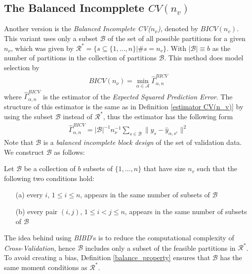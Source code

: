 \documentclass[Research_Module_ES.tex]{subfiles}
\begin{document}
\subsection{The Balanced Incompplete $CV(n_v)$}
Another version is the \textit{Balanced Incomplete CV($n_\nu$)}, denoted by $BICV(n_v)$. This variant uses only a subset $\mathcal{B}$ of the set of all possible partitions for a given $n_\nu$, which was given by $\mathcal{R}^\ast= \{s\subseteq\{1,\dots,n\}|\# s=n_v\}$. With $|\mathcal{B}|\equiv b$ as the number of partitions in the collection of partitions $\mathcal{B}$. This method does model selection by 
\begin{align*}
	BICV(n_\nu)=\min_{\alpha\in\mathcal{A}}\hat{\Gamma}_{\alpha,n}^{BICV}
\end{align*}
where $\hat{\Gamma}_{\alpha,n}^{BICV}$ is the estimator of the \textit{Expected Squared Prediction Error}. The structure of this estimator is the same as in Definition \ref{estimator CV(n_v)} by using the subset $\mathcal{B}$ instead of $\mathcal{R}^\ast$, thus the estimator has the following form
\begin{align*}
	\hat{\Gamma}_{\alpha,n}^{BICV}=|\mathcal{B}|^{-1}n_\nu^{-1}\sum_{s\in\mathcal{B}}\parallel y_s-\hat{y}_{\alpha,s^c}\parallel^2
\end{align*}
Note that $\mathcal{B}$ is a \textit{balanced incomplete block design} of the set of validation data. We construct $\mathcal{B}$ as follows: 
\begin{defi}
\label{balance_property}
Let $\mathcal{B}$ be a collection of $b$ subsets of $\{ 1,\dots,n\}$ that have size $n_v$ such that the following two conditions hold:
\begin{enumerate}
\item[(a)] every $i$, $1\le i \le n$, appears in the same number of subsets of $\mathcal{B}$
\item[(b)] every pair $(i,j)$, $1\le i < j \le n$, appears in the same number of subsets of $\mathcal{B}$
\end{enumerate}
\end{defi}
The idea behind using \textit{BIBD}'s is to reduce the computational complexity of \textit{Cross-Validation}, hence $\mathcal{B}$ includes only a subset of the feasible partitions in $\mathcal{R}^\ast$. To avoid creating a bias, Definition \ref{balance_property} ensures that $\mathcal{B}$ has the same moment conditions as $\mathcal{R}^\ast$. \\
\end{document}

